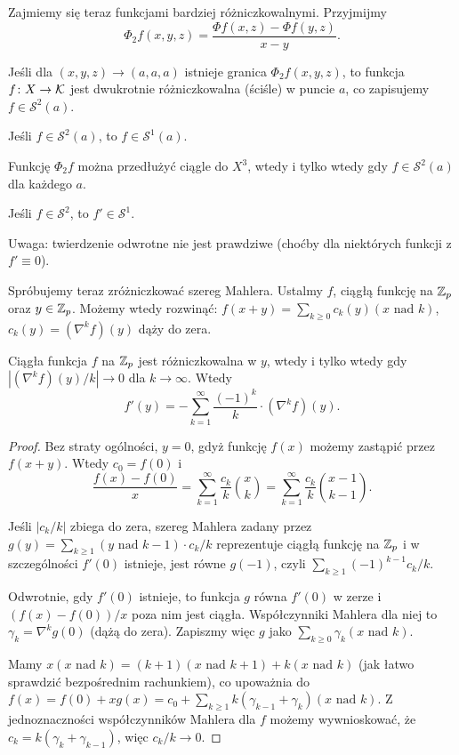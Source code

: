 Zajmiemy się teraz funkcjami bardziej różniczkowalnymi.
Przyjmijmy
\[
	\Phi_2 f(x, y, z) = \frac{\Phi f(x,z) - \Phi f(y, z)}{x-y}.
\]

\begin{definicja}
	Jeśli dla $(x, y, z) \to (a,a,a)$ istnieje granica $\Phi_2 f(x,y,z)$, to funkcja $f \colon X \to \mathcal K$ jest dwukrotnie różniczkowalna (ściśle) w puncie $a$, co zapisujemy $f \in \mathcal S^2(a)$.
\end{definicja}

\begin{fakt}
	Jeśli $f \in \mathcal S^2(a)$, to $f \in \mathcal S^1(a)$.
\end{fakt}

\begin{definicja}
	Funkcję $\Phi_2f$ można przedłużyć ciągle do $X^3$, wtedy i tylko wtedy gdy $f \in \mathcal S^2(a)$ dla każdego $a$.
\end{definicja}

\begin{fakt}
	Jeśli $f \in \mathcal S^2$, to $f' \in \mathcal S^1$.
\end{fakt}

Uwaga: twierdzenie odwrotne nie jest prawdziwe (choćby dla niektórych funkcji z $f' \equiv 0$).

Spróbujemy teraz zróżniczkować szereg Mahlera.
Ustalmy $f$, ciągłą funkcję na $\mathbb Z_p$ oraz $y \in \mathbb Z_p$.
Możemy wtedy rozwinąć: $f(x+y) = \sum_{k \ge 0} c_k(y) (x \mbox { nad } k)$, $c_k(y) = (\nabla^k f)(y)$ dąży do zera.

\begin{fakt}
	Ciągła funkcja $f$ na $\mathbb Z_p$ jest różniczkowalna w $y$, wtedy i tylko wtedy gdy $|(\nabla^k f)(y) / k| \to 0$ dla $k \to \infty$.
	Wtedy
	\[
		f'(y) = - \sum_{k=1}^\infty \frac{(-1)^k }{k} \cdot (\nabla^k f)(y).
	\]
\end{fakt}

\begin{proof}
Bez straty ogólności, $y = 0$, gdyż funkcję $f(x)$ możemy zastąpić przez $f(x+y)$.
Wtedy $c_0 = f(0)$ i 
\[
	\frac{f(x) - f(0)}{x} = \sum_{k=1}^\infty \frac{c_k}{k} {x \choose k} = \sum_{k=1}^\infty \frac{c_k}{k} {x-1 \choose k-1}.
\]

Jeśli $|c_k/k|$ zbiega do zera, szereg Mahlera zadany przez $g(y) = \sum_{k \ge 1} (y \mbox{ nad } k-1) \cdot {c_k}/{k}$ reprezentuje ciągłą funkcję na $\mathbb Z_p$ i w szczególności $f'(0)$ istnieje, jest równe $g(-1)$, czyli $\sum_{k \ge 1} (-1)^{k-1} {c_k}/{k}$.

Odwrotnie, gdy $f'(0)$ istnieje, to funkcja $g$ równa $f'(0)$ w zerze i $(f(x) - f(0)) / x$ poza nim jest ciągła.
Współczynniki Mahlera dla niej to $\gamma_k = \nabla^k g(0)$ (dążą do zera).
Zapiszmy więc $g$ jako $\sum_{k \ge 0} \gamma_k (x \mbox{ nad } k)$.

Mamy $x (x \mbox{ nad } k) = (k+1) (x \mbox{ nad } k+1) + k (x \mbox{ nad } k)$ (jak łatwo sprawdzić bezpośrednim rachunkiem), co upoważnia do $f(x) = f(0) + x g(x) = c_0 + \sum_{k \ge 1} k (\gamma_{k-1} + \gamma_k) (x \mbox{ nad } k)$. 
Z jednoznaczności współczynników Mahlera dla $f$ możemy wywnioskować, że $c_k = k(\gamma_k + \gamma_{k-1})$, więc $c_k / k \to 0$.
\end{proof}

